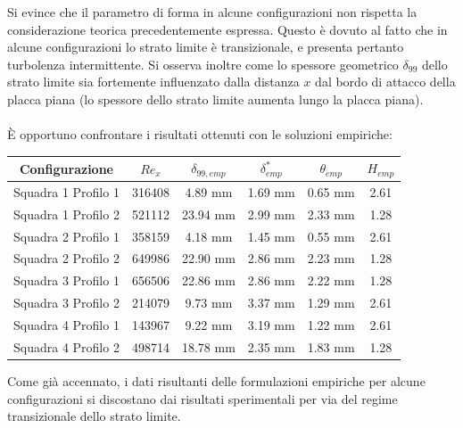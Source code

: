 \noindent Si evince che il parametro di forma in alcune configurazioni non rispetta la considerazione teorica precedentemente espressa. Questo è dovuto al fatto che in alcune configurazioni lo strato limite è transizionale, e presenta pertanto turbolenza intermittente. Si osserva inoltre come lo spessore geometrico $\delta_{99}$ dello strato limite sia fortemente influenzato dalla distanza $x$ dal bordo di attacco della placca piana (lo spessore dello strato limite aumenta lungo la placca piana).\\\\
\noindent È opportuno confrontare i risultati ottenuti con le soluzioni empiriche:
\begin{table}[H]
    \centering
    \begin{tabular}{|c|c|c|c|c|c|}
    \hline
    Configurazione             & $Re_x$ & $\delta_{99,emp}$ & $\delta^*_{emp}$ & $\theta_{emp}$ & $H_{emp}$ \\ \hline
    Squadra 1 Profilo 1 & 316408 & 4.89 mm           & 1.69 mm          & 0.65 mm        & 2.61      \\ \hline
    Squadra 1 Profilo 2 & 521112 & 23.94 mm          & 2.99 mm          & 2.33 mm        & 1.28      \\ \hline
    Squadra 2 Profilo 1 & 358159 & 4.18 mm           & 1.45 mm          & 0.55 mm        & 2.61      \\ \hline
    Squadra 2 Profilo 2 & 649986 & 22.90 mm          & 2.86 mm          & 2.23 mm        & 1.28      \\ \hline
    Squadra 3 Profilo 1 & 656506 & 22.86 mm          & 2.86 mm          & 2.22 mm        & 1.28      \\ \hline
    Squadra 3 Profilo 2 & 214079 & 9.73 mm           & 3.37 mm          & 1.29 mm        & 2.61      \\ \hline
    Squadra 4 Profilo 1 & 143967 & 9.22 mm           & 3.19 mm          & 1.22 mm        & 2.61      \\ \hline
    Squadra 4 Profilo 2 & 498714 & 18.78 mm          & 2.35 mm          & 1.83 mm        & 1.28      \\ \hline
    \end{tabular}
\end{table}

\noindent Come già accennato, i dati risultanti delle formulazioni empiriche per alcune configurazioni si discostano dai risultati sperimentali per via del regime transizionale dello strato limite.

